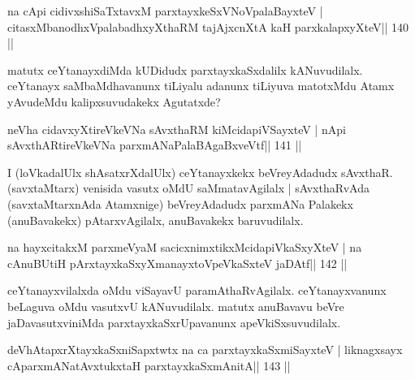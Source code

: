 \begin{shl}
na cApi cidivxshiSaTxtavxM parxtayxkeSxVNoVpalaBayxteV |
citasxMbanodhxVpalabadhxyXthaRM tajAjxcnXtA kaH parxkalapxyXteV\hfill || 140 ||
\end{shl}

\begin{artha}
matutx ceYtanayxdiMda kUDidudx parxtayxkaSxdalilx kANuvudilalx. ceYtanayx saMbaMdhavanunx tiLiyalu adanunx tiLiyuva matotxMdu Atamx yAvudeMdu kalipxsuvudakekx Agutatxde? 
\end{artha}

\begin{shl}
neVha cidavxyXtireVkeVNa sAvxthaRM kiMcidapiVSayxteV |
nApi sAvxthARtireVkeVNa parxmANaPalaBAgaBxveVtf\hfill || 141 ||
\end{shl}

\begin{artha}
I (loVkadalUlx shAsatxrXdalUlx) ceYtanayxkekx beVreyAdadudx sAvxthaR.  (savxtaMtarx) venisida vasutx oMdU saMmatavAgilalx | sAvxthaRvAda  (savxtaMtarxnAda Atamxnige) beVreyAdadudx parxmANa Palakekx  (anuBavakekx) pAtarxvAgilalx, anuBavakekx baruvudilalx.
\end{artha}

\begin{shl}
na hayxcitakxM parxmeVyaM sacicxnimxtikxMcidapiVkaSxyXteV |
na cAnuBUtiH pArxtayxkaSxyXmanayxtoV\s peVkaSxteV jaDAtf\hfill || 142 ||
\end{shl}

\begin{artha}
ceYtanayxvilalxda oMdu viSayavU paramAthaRvAgilalx. ceYtanayxvanunx  beLaguva oMdu vasutxvU kANuvudilalx. matutx anuBavavu beVre jaDavasutxviniMda parxtayxkaSxrUpavanunx apeVkiSxsuvudilalx.
\end{artha}


\begin{shl}
\footnotemark[3]deVhAtapxrXtayxkaSxniSapxtwtx na ca parxtayxkaSxmiSayxteV |
liknagxsayx cAparxmANatAvxtukxtaH  parxtayxkaSxmAnitA\hfill || 143 ||
\end{shl}

